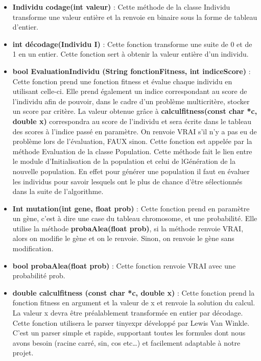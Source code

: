 \documentclass[a4paper,11pt]{article}
\begin{document}
				\begin{itemize}
							\item \textbf{Individu codage(int valeur)} : Cette méthode de la classe Individu transforme une valeur entière et la renvoie en binaire sous la forme de tableau d’entier.\vspace{0.2cm}
							\item \textbf{int décodage(Individu I)} : Cette fonction transforme une suite de 0 et de 1 en un entier. Cette fonction sert à obtenir la valeur entière d’un individu.\vspace{0.2cm}
							\item \textbf{bool EvaluationIndividu (String fonctionFitness, int indiceScore)} : Cette fonction prend une fonction fitness et évalue chaque individu en utilisant celle-ci. 
																									Elle prend également un indice correspondant  au score de l’individu afin de pouvoir, dans le cadre d’un problème multicritère, stocker un score par critère. 
																									La valeur obtenue grâce à \textbf{calculfitness(const char *c, double x)} correspondra au score de l’individu et sera écrite dans le tableau des scores à l’indice passé en paramètre.
																									On renvoie VRAI s’il n’y a pas eu de problème lors de l’évaluation, FAUX sinon. Cette fonction est appelée par la méthode Evaluation de la classe Population.
																									Cette méthode fait le lien entre le module d’Initialisation de la population et celui de lGénération de la nouvelle population.
																									En effet pour générer une population il faut en évaluer les individus pour savoir lesquels ont le plus de chance d'être sélectionnés dans la suite de l'algorithme.\vspace{0.2cm}
							\item \textbf{Int mutation(int gene, float prob)} : Cette fonction prend en paramètre un gène, c’est à dire une case du tableau chromosome, et une probabilité.
																		Elle utilise la méthode \textbf{probaAlea(float prob)}, si la méthode renvoie VRAI, alors on modifie le gène et on le renvoie.
																		Sinon, on renvoie le gène sans modification.\vspace{0.2cm}
							\item \textbf{bool probaAlea(float prob)} : Cette fonction renvoie VRAI avec une probabilité prob.\vspace{0.2cm}
							\item \textbf{double calculfitness (const char *c, double x)} : Cette fonction prend la fonction fitness en argument et la valeur de x et renvoie la solution du calcul. La valeur x devra être préalablement transformée en entier par décodage.
								Cette fonction utilisera le parser tinyexpr développé par Lewis Van Winkle. 
								C’est un parser simple et rapide, supportant toutes les formules dont nous avons besoin (racine carré, sin, cos etc…) et facilement adaptable à notre projet. 
					\end{itemize}
					
\end{document}
